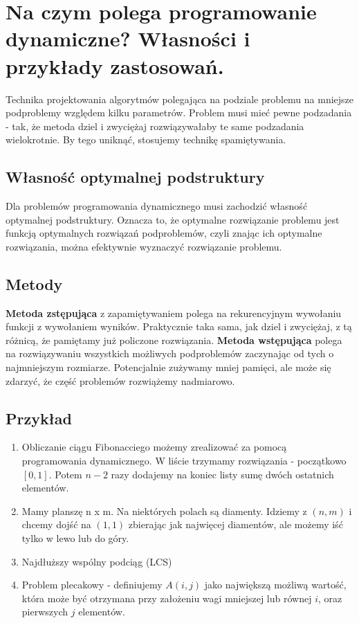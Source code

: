 \section{Na czym polega programowanie dynamiczne? Własności i przykłady zastosowań.}


Technika projektowania algorytmów polegająca na podziale problemu na mniejsze podproblemy względem kilku parametrów.
Problem musi mieć pewne podzadania - tak, że metoda dziel i zwyciężaj rozwiązywałaby te same podzadania wielokrotnie.
By tego uniknąć, stosujemy technikę spamiętywania.

\subsection{Własność optymalnej podstruktury}
Dla problemów programowania dynamicznego musi zachodzić własność optymalnej podstruktury.
Oznacza to, że optymalne rozwiązanie problemu jest funkcją optymalnych rozwiązań podproblemów,
czyli znając ich optymalne rozwiązania, można efektywnie wyznaczyć rozwiązanie problemu.

\subsection{Metody}
\textbf{Metoda zstępująca} z zapamiętywaniem polega na rekurencyjnym wywołaniu funkcji z wywołaniem wyników.
Praktycznie taka sama, jak dziel i zwyciężaj, z tą różnicą, że pamiętamy już policzone rozwiązania.
\textbf{Metoda wstępująca} polega na rozwiązywaniu wszystkich możliwych podproblemów zaczynając od tych o najmniejszym rozmiarze.
Potencjalnie zużywamy mniej pamięci, ale może się zdarzyć, że część problemów rozwiążemy nadmiarowo.

\subsection{Przykład}
\begin{enumerate}[itemsep=0pt,partopsep=0pt, parsep=0pt]
    \item Obliczanie ciągu Fibonacciego możemy zrealizować za pomocą programowania dynamicznego.
    W liście trzymamy rozwiązania - początkowo $[0, 1]$.
    Potem $n-2$ razy dodajemy na koniec listy sumę dwóch ostatnich elementów.

    \item Mamy planszę n x m. Na niektórych polach są diamenty.
    Idziemy z $(n, m)$ i chcemy dojść na $(1, 1)$ zbierając jak najwięcej diamentów,
    ale możemy iść tylko w lewo lub do góry.

    \item Najdłuższy wspólny podciąg (LCS)

    \item Problem plecakowy - definiujemy $A(i, j)$ jako największą możliwą wartość,
    która może być otrzymana przy założeniu wagi mniejszej lub równej $i$, oraz pierwszych $j$ elementów.
\end{enumerate}
